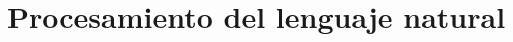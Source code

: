 \documentclass[11pt,spanish,listoffigures,listoftables]{tfgetsinf}
\begin{document}







\section{Procesamiento del lenguaje natural}
\end{document}
